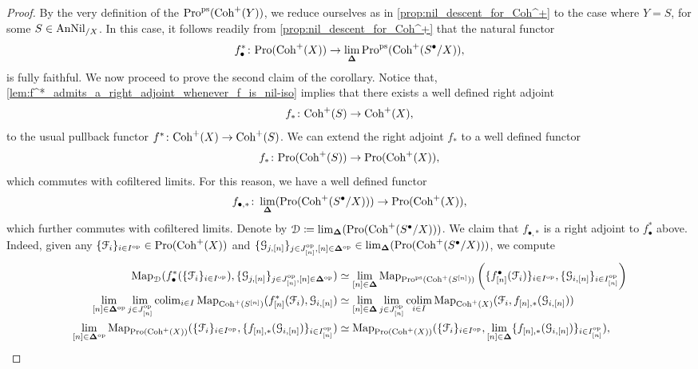 \documentclass[10pt,a4paper,reqno]{amsart} %
\theoremstyle{plain}
\theoremstyle{definition}
\theoremstyle{remark}
\numberwithin{equation}{section}
\begin{document}
\begin{proof}
    By the very definition of the \infcat $\mathrm{Pro}^\mathrm{ps}(\mathrm{Coh}^+(Y))$, we reduce ourselves as in
    \cref{prop:nil_descent_for_Coh^+} to the case where $Y = S$, for some $S \in \mathrm{AnNil}_{/X}$. In this case, it follows readily from
    \cref{prop:nil_descent_for_Coh^+} that the natural functor
        \[
            f_\bullet^* \colon \mathrm{Pro}(\mathrm{Coh}^+(X)) \to \lim_{\bm{\Delta}} \mathrm{Pro}^\mathrm{ps}(\mathrm{Coh}^+(S^\bullet/X)),  
        \]
    is fully faithful. We now proceed to prove the second claim of the corollary. Notice that,
    \cref{lem:f^*_admits_a_right_adjoint_whenever_f_is_nil-iso} implies that there exists a well defined right adjoint
        \[
            f_* \colon \mathrm{Coh}^+(S) \to \mathrm{Coh}^+(X),  
        \]
    to the usual pullback functor $f^* \colon \mathrm{Coh}^+(X) \to \mathrm{Coh}^+(S)$. We can extend the right adjoint $f_*$ to a well defined functor
        \[
            f_* \colon \mathrm{Pro}(\mathrm{Coh}^+(S)) \to \mathrm{Pro}(\mathrm{Coh}^+(X)),  
        \]
    which commutes with cofiltered limits. For this reason, we have a well defined functor
        \[
            f_{\bullet, *} \colon \lim_{\bm{\Delta}}(\mathrm{Pro}(\mathrm{Coh}^+(S^\bullet/X))) \to \mathrm{Pro}(\mathrm{Coh}^+(X)),  
        \]
    which further commutes with cofiltered limits. Denote by $\mathcal D \coloneqq \lim_{\bm{\Delta}}(\mathrm{Pro}(\mathrm{Coh}^+(S^\bullet/X)))$.
    We claim that $ f_{\bullet, *}$ is a right adjoint to $f_\bullet^*$ above.
    Indeed, given
    any $\{ \mathcal F_i \}_{i \in I^\mathrm{op}}  \in \mathrm{Pro}(\mathrm{Coh}^+(X))$ and $\{ \mathcal G_{j, [n]} \}_{j \in J_{[n]} ^\mathrm{op}, [n] \in \bm{\Delta} ^\mathrm{op}} \in \lim_{\bm{\Delta}}(\mathrm{Pro}(\mathrm{Coh}^+(S^\bullet/X)))$,
    we compute
        \begin{align*}
            \operatorname{Map}_{\mathcal D}( f_\bullet^*( \{ \mathcal F_i \}_{i \in I^\mathrm{op}}), \{ \mathcal G_{j, [n]} \}_{j \in J^\mathrm{op}_{[n]}, [n] \in \bm{\Delta} ^\mathrm{op}}) & \simeq \lim_{[n] \in \bm{\Delta}} \operatorname{Map}_{\mathrm{Pro}^\mathrm{ps}(\mathrm{Coh}^+(S^{[n]}))} \bigg( \{f_{[n]}^\bullet(\mathcal F_i) \}_{i \in I^\mathrm{op}},  \{ \mathcal G_{i, [n]} \}_{i \in I^\mathrm{op}_{[n]}} \bigg) \\
            \lim_{[n] \in \bm{\Delta} ^\mathrm{op}} \lim_{j \in J^\mathrm{op}_{[n]}} \mathrm{colim}_{i \in I} \operatorname{Map}_{\mathrm{Coh}^+(S^{[n]})} ( f_{[n]}^*(\mathcal F_i),   \mathcal G_{i, [n]}) & \simeq \lim_{[n] \in \bm{\Delta}} \lim_{j \in J^\mathrm{op}_{[n]}} \operatorname*{colim}_{i \in I} \operatorname{Map}_{\mathrm{Coh}^+(X)} (\mathcal F_i, f_{[n], *}(\mathcal G_{i, [n]})) \\
            \lim_{[n] \in \bm{\Delta} ^\mathrm{op}} \operatorname{Map}_{\mathrm{Pro}(\mathrm{Coh}^+(X))}( \{\mathcal F_i\}_{i \in I^\mathrm{op}}, \{f_{[n], *}(\mathcal G_{i, [n]}) \}_{i \in I_{[n]} ^\mathrm{op}}) & \simeq \operatorname{Map}_{\mathrm{Pro}(\mathrm{Coh}^+(X))}( \{\mathcal F_i\}_{i \in I^\mathrm{op}}, \lim_{[n] \in \bm{\Delta}} \{f_{[n], *}(\mathcal G_{i, [n]}) \}_{i \in I_{[n]} ^\mathrm{op}}),
        \end{align*}

\end{proof}
\end{document}
